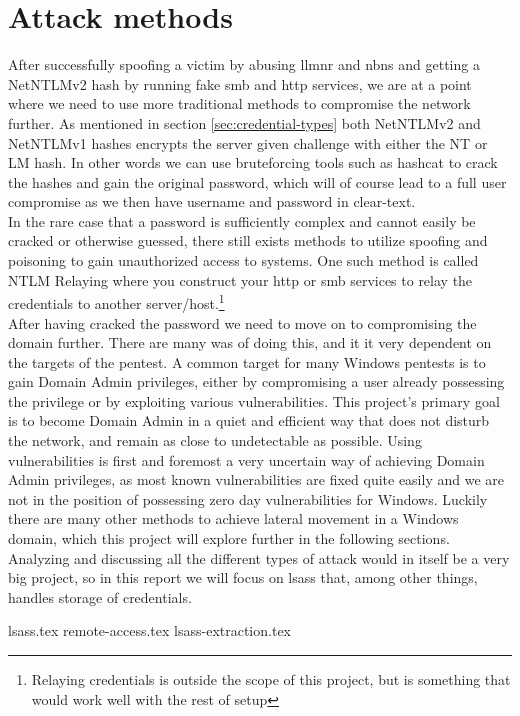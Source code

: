 \documentclass{article}
\begin{document}
\section{Attack methods}
After successfully spoofing a victim by abusing \gls{llmnr} and \gls{nbns} and getting a NetNTLMv2 hash by running fake \gls{smb} and \gls{http} services, we are at a point where we need to use more traditional methods to compromise the network further. As mentioned in section \ref{sec:credential-types} both NetNTLMv2 and NetNTLMv1 hashes encrypts the server given challenge with either the NT or LM hash. In other words we can use bruteforcing tools such as hashcat\cite{url:hashes:hashcat-example-hashes} to crack the hashes and gain the original password, which will of course lead to a full user compromise as we then have username and password in clear-text.
\\
In the rare case that a password is sufficiently complex and cannot easily be cracked or otherwise guessed, there still exists methods to utilize spoofing and poisoning to gain unauthorized access to systems. One such method is called NTLM Relaying\cite{url:ntlm-relaying} where you construct your \gls{http} or \gls{smb} services to relay the credentials to another server/host.\footnote{Relaying credentials is outside the scope of this project, but is something that would work well with the rest of setup}
\\
After having cracked the password we need to move on to compromising the domain further. There are many was of doing this, and it it very dependent on the targets of the pentest. A common target for many Windows pentests is to gain Domain Admin privileges, either by compromising a user already possessing the privilege or by exploiting various vulnerabilities. This project's primary goal is to become Domain Admin in a quiet and efficient way that does not disturb the network, and remain as close to undetectable as possible. Using vulnerabilities is first and foremost a very uncertain way of achieving Domain Admin privileges, as most known vulnerabilities are fixed quite easily and we are not in the position of possessing zero day vulnerabilities for Windows. Luckily there are many other methods to achieve lateral movement in a Windows domain, which this project will explore further in the following sections. Analyzing and discussing all the different types of attack would in itself be a very big project, so in this report we will focus on \gls{lsass} that, among other things, handles storage of credentials.

{lsass.tex}
{remote-access.tex}
{lsass-extraction.tex}
\end{document}

